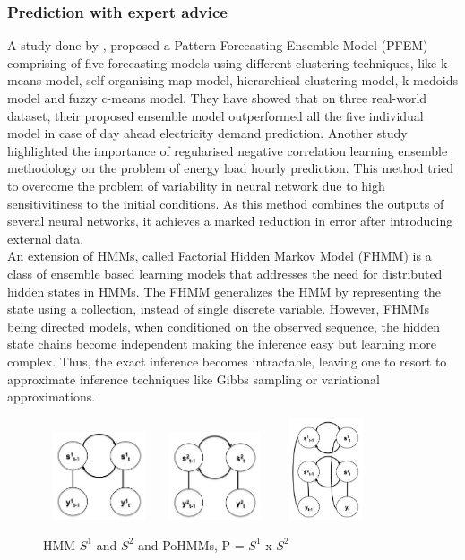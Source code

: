 \documentclass{acm_proc_article-sp}
\begin{document}
\subsubsection{Prediction with expert advice}
A study done by \cite{Shen}, proposed a Pattern Forecasting Ensemble Model (PFEM) comprising of five forecasting models using different clustering techniques, like k-means model, self-organising map model, hierarchical clustering model, k-medoids model and fuzzy c-means model. They have showed that on three real-world dataset, their proposed ensemble model outperformed all the five individual model in case of day ahead electricity demand prediction.
Another study \cite{Felice} highlighted the importance of regularised negative correlation learning ensemble methodology on the problem of energy load hourly prediction. This method tried to overcome the problem of variability in neural network due to high sensitivitiness to the initial conditions. As this method combines the outputs of several neural networks, it achieves a marked reduction in error after introducing external data. \\
An extension of HMMs, called Factorial Hidden Markov Model (FHMM) \cite{fhmm} is a class of ensemble based learning models that addresses the need for distributed hidden states in HMMs. The FHMM generalizes the HMM by representing the state using a collection, instead of single discrete variable. However, FHMMs being directed models, when conditioned on the observed sequence, the hidden state chains become independent making the inference easy but learning more complex. Thus, the exact inference becomes intractable, leaving one to resort to approximate inference techniques like Gibbs sampling or variational approximations.


\begin{figure}
\centering
\includegraphics[width=3.3cm,height=2.6cm]{hmm1.jpg}
\includegraphics[width=3.3cm,height=2.6cm]{hmm2.jpg}
\includegraphics[width=3cm,height=3cm]{product}
\caption{HMM $S^1$ and $S^2$ and PoHMMs, P = $S^{1}$ x $S^2$}
\label{fig:HMMs}
\end{figure}
\end{document}
